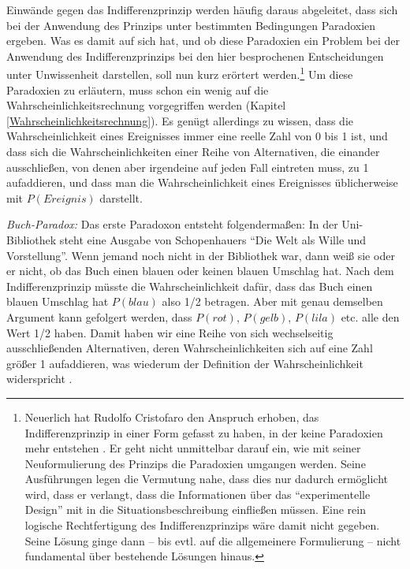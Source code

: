 Einwände gegen das Indifferenzprinzip werden häufig daraus abgeleitet, dass sich
bei der Anwendung des Prinzips unter bestimmten Bedingungen Paradoxien ergeben.
Was es damit auf sich hat, und ob diese Paradoxien ein Problem bei der Anwendung
des Indifferenzprinzips bei den hier besprochenen Entscheidungen unter
Unwissenheit darstellen, soll nun kurz erörtert werden.\footnote{Neuerlich hat
Rudolfo Cristofaro den Anspruch erhoben, das Indifferenzprinzip in einer Form
gefasst zu haben, in der keine Paradoxien mehr entstehen
\cite[]{cristofaro:2008}. Er geht nicht unmittelbar darauf ein, wie mit seiner
Neuformulierung des Prinzips die Paradoxien umgangen werden. Seine Ausführungen
legen die Vermutung nahe, dass dies nur dadurch ermöglicht wird, dass er
verlangt, dass die Informationen über das "`experimentelle Design"' mit in die
Situationsbeschreibung einfließen müssen. Eine rein logische Rechtfertigung des
Indifferenzprinzips wäre damit nicht gegeben. Seine Lösung ginge dann -- bis
evtl. auf die allgemeinere Formulierung -- nicht fundamental über bestehende
Lösungen hinaus.} Um diese Paradoxien zu erläutern, muss schon ein wenig auf die
Wahrscheinlichkeitsrechnung vorgegriffen werden (Kapitel
\ref{Wahrscheinlichkeitsrechnung}). Es genügt allerdings zu wissen, dass die
Wahrscheinlichkeit eines Ereignisses immer eine reelle Zahl von 0 bis 1 ist, und
dass sich die Wahrscheinlichkeiten einer Reihe von Alternativen, die einander
ausschließen, von denen aber irgendeine auf jeden Fall eintreten muss, zu 1
aufaddieren, und dass man die Wahrscheinlichkeit eines Ereignisses üblicherweise
mit $P(Ereignis)$ darstellt.

{\em Buch-Paradox:}\label{BuchParadox} Das erste
Paradoxon entsteht folgendermaßen: In der Uni-Bibliothek steht eine Ausgabe von
Schopenhauers "`Die Welt als Wille und Vorstellung"'. Wenn jemand noch nicht in
der Bibliothek war, dann weiß sie oder er nicht, ob das Buch einen blauen oder
keinen blauen Umschlag hat. Nach dem Indifferenzprinzip müsste die
Wahrscheinlichkeit dafür, dass das Buch einen blauen Umschlag hat $P(blau)$ also
1/2 betragen. Aber mit genau demselben Argument kann gefolgert werden, dass
$P(rot)$, $P(gelb)$, $P(lila)$ etc. alle den Wert 1/2 haben. Damit haben wir eine
Reihe von sich wechselseitig ausschließenden Alternativen, deren
Wahrscheinlichkeiten sich auf eine Zahl größer 1 aufaddieren, was wiederum der
Definition der Wahrscheinlichkeit widerspricht \cite[S. 37f.]{gillies:2000}.

